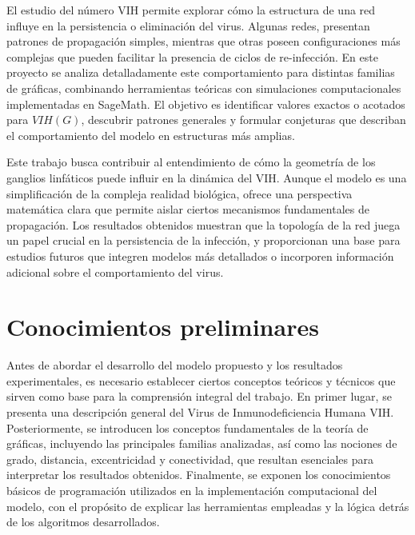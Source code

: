 \documentclass[12pt,titlepage,twoside,openright]{book}
\begin{document}
El estudio del n\'umero VIH permite explorar c\'omo la estructura de una red influye en la persistencia o eliminaci\'on del virus. Algunas redes, presentan patrones de propagaci\'on simples, mientras que otras poseen configuraciones m\'as complejas que pueden facilitar la presencia de ciclos de re-infecci\'on. En este proyecto se analiza detalladamente este comportamiento para distintas familias de gr\'aficas, combinando herramientas te\'oricas con simulaciones computacionales implementadas en SageMath. El objetivo es identificar valores exactos o acotados para $VIH(G)$, descubrir patrones generales y formular conjeturas que describan el comportamiento del modelo en estructuras m\'as amplias.

Este trabajo busca contribuir al entendimiento de c\'omo la geometr\'ia de los ganglios linf\'aticos puede influir en la din\'amica del VIH. Aunque el modelo es una simplificaci\'on de la compleja realidad biol\'ogica, ofrece una perspectiva matem\'atica clara que permite aislar ciertos mecanismos fundamentales de propagaci\'on. Los resultados obtenidos muestran que la topolog\'ia de la red juega un papel crucial en la persistencia de la infecci\'on, y proporcionan una base para estudios futuros que integren modelos m\'as detallados o incorporen informaci\'on adicional sobre el comportamiento del virus.


\chapter{Conocimientos preliminares}
Antes de abordar el desarrollo del modelo propuesto y los resultados experimentales, es necesario establecer ciertos conceptos te\'oricos y t\'ecnicos que sirven como base para la comprensi\'on integral del trabajo. En primer lugar, se presenta una descripci\'on general del Virus de Inmunodeficiencia Humana VIH. Posteriormente, se introducen los conceptos fundamentales de la teor\'ia de gr\'aficas, incluyendo las principales familias analizadas, as\'i como las nociones de grado, distancia, excentricidad y conectividad, que resultan esenciales para interpretar los resultados obtenidos. Finalmente, se exponen los conocimientos b\'asicos de programaci\'on utilizados en la implementaci\'on computacional del modelo, con el prop\'osito de explicar las herramientas empleadas y la l\'ogica detr\'as de los algoritmos desarrollados.
\end{document}
